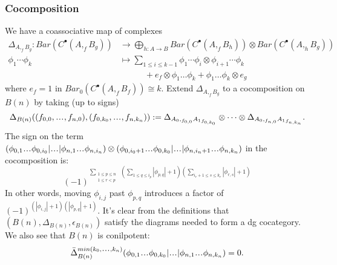 \subsubsection{Cocomposition}
We have a coassociative map of complexes
%
\begin{align*}
\Delta_{A, _fB_g}: Bar(C^\bullet(A, _fB_g)) 
&\to \bigoplus\limits_{h: A \to B} Bar(C^\bullet(A, _fB_h)) \otimes Bar(C^\bullet(A, _hB_g)) \\
\phi_1 \cdots \phi_k 
&\mapsto \sum\limits_{1\leq i \leq k-1} 
\phi_1 \cdots \phi_i \otimes 
  \phi_{i+1} \cdots \phi_k\\
&\phantom{{}\mapsto \sum{}}
  + e_f\otimes \phi_1 \dots \phi_k + 
  \phi_1 \dots \phi_k \otimes e_g  
\end{align*}
%
where 
$e_f = 1$ in $Bar_0(C^\bullet(A, _fB_f)) \cong k$.
Extend $\Delta_{A, _fB_g}$ to a 
cocomposition on $B(n)$ by taking 
(up to signs)
$$
\Delta_{B(n)}((f_{0,0},\smdots,f_{n,0}), 
  (f_{0,k_0},\smdots,f_{n,k_n})) :=
\Delta_{A_0, _{f_{0,0}}{A_1}_{f_{0,k_0}}} 
\otimes \dots \otimes
\Delta_{A_0, _{f_{n,0}}{A_1}_{f_{n,k_n}}}.
$$
The sign on the term
$
(\phi_{0,1}\smdots \phi_{0,i_0} | \smdots |
\phi_{n,1}\smdots \phi_{n,i_n}) \otimes
(\phi_{0,i_0+1}\smdots \phi_{0,k_0} | \smdots |
\phi_{n,i_n+1}\smdots \phi_{n,k_n}) 
$
in the cocomposition is:
\begin{equation}
\label{eq:coprod_signs}
(-1)^{\sum \limits_{\substack{
  1 \leq p \leq n\\ 1 \leq r<p}}\;
(\sum \limits_{1\leq q \leq i_p} |\phi_{p,q}|+1)
(\sum \limits_{i_r+1 \leq s \leq k_r} |\phi_{r,s}|+1)}
\end{equation}
%
In other words, moving $\phi_{i,j}$ past 
$\phi_{p,q}$ introduces a factor of 
$(-1)^{(|\phi_{i,j}|+1)(|\phi_{p,q}|+1)}$.
It's clear from the definitions that
$(B(n), \Delta_{B(n)}, \epsilon_{B(n)})$ 
satisfy the diagrams needed to form a dg cocategory. 
We also see that $B(n)$ is conilpotent: 
$$
\bar{\Delta}_{B(n)}^{min(k_0,\smdots,k_n)}
(\phi_{0,1}\smdots\phi_{0,k_0}|\smdots|
\phi_{n,1}\smdots\phi_{n,k_n}) = 0.
$$